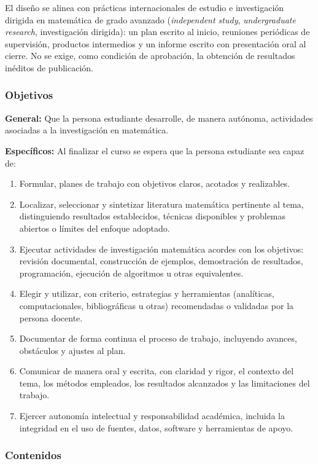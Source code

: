 \begin{refsection}
El diseño se alinea con prácticas internacionales de estudio e investigación dirigida en matemática de grado avanzado (\emph{independent study}, \emph{undergraduate research}, investigación dirigida): un plan escrito al inicio, reuniones periódicas de supervisión, productos intermedios y un informe escrito con presentación oral al cierre. No se exige, como condición de aprobación, la obtención de resultados inéditos de publicación.

\subsubsection*{Objetivos}

\textbf{General:} Que la persona estudiante desarrolle, de manera autónoma, actividades asociadas a la investigación en matemática.

\textbf{Específicos:} Al finalizar el curso se espera que la persona estudiante sea capaz de:

\begin{enumerate}
\item Formular, planes de trabajo con objetivos claros, acotados y realizables.
\item Localizar, seleccionar y sintetizar literatura matemática pertinente al tema, distinguiendo resultados establecidos, técnicas disponibles y problemas abiertos o límites del enfoque adoptado.
\item Ejecutar actividades de investigación matemática acordes con los objetivos: revisión documental, construcción de ejemplos, demostración de resultados, programación, ejecución de algoritmos u otras equivalentes.
\item Elegir y utilizar, con criterio, estrategias y herramientas (analíticas, computacionales, bibliográficas u otras) recomendadas o validadas por la persona docente.
\item Documentar de forma continua el proceso de trabajo, incluyendo avances, obstáculos y ajustes al plan.
\item Comunicar de manera oral y escrita, con claridad y rigor, el contexto del tema, los métodos empleados, los resultados alcanzados y las limitaciones del trabajo.
\item Ejercer autonomía intelectual y responsabilidad académica, incluida la integridad en el uso de fuentes, datos, software y herramientas de apoyo.
\end{enumerate}

\subsubsection*{Contenidos}


\end{refsection}

